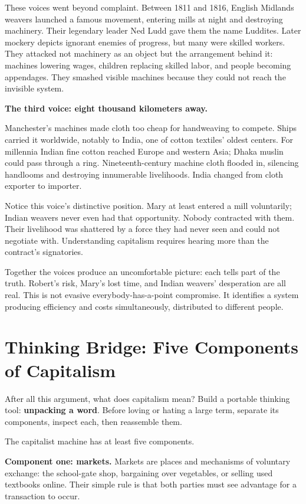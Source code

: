 These voices went beyond complaint. Between 1811 and 1816, English Midlands weavers launched a famous movement, entering mills at night and destroying machinery. Their legendary leader Ned Ludd gave them the name Luddites. Later mockery depicts ignorant enemies of progress, but many were skilled workers. They attacked not machinery as an object but the arrangement behind it: machines lowering wages, children replacing skilled labor, and people becoming appendages. They smashed visible machines because they could not reach the invisible system.

\textbf{The third voice: eight thousand kilometers away.}

Manchester's machines made cloth too cheap for handweaving to compete. Ships carried it worldwide, notably to India, one of cotton textiles' oldest centers. For millennia Indian fine cotton reached Europe and western Asia; Dhaka muslin could pass through a ring. Nineteenth-century machine cloth flooded in, silencing handlooms and destroying innumerable livelihoods. India changed from cloth exporter to importer.

Notice this voice's distinctive position. Mary at least entered a mill voluntarily; Indian weavers never even had that opportunity. Nobody contracted with them. Their livelihood was shattered by a force they had never seen and could not negotiate with. Understanding capitalism requires hearing more than the contract's signatories.

Together the voices produce an uncomfortable picture: each tells part of the truth. Robert's risk, Mary's lost time, and Indian weavers' desperation are all real. This is not evasive everybody-has-a-point compromise. It identifies a system producing efficiency and costs simultaneously, distributed to different people.

\section{Thinking Bridge: Five Components of Capitalism}
After all this argument, what does capitalism mean? Build a portable thinking tool: \textbf{unpacking a word}. Before loving or hating a large term, separate its components, inspect each, then reassemble them.

The capitalist machine has at least five components.

\textbf{Component one: markets.} Markets are places and mechanisms of voluntary exchange: the school-gate shop, bargaining over vegetables, or selling used textbooks online. Their simple rule is that both parties must see advantage for a transaction to occur.

